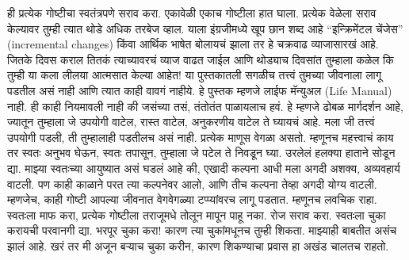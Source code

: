 ही प्रत्येक गोष्टीचा स्वतंत्रपणे सराव करा. एकावेळी एकाच गोष्टीला हात घाला. प्रत्येक वेळेला सराव केल्यावर तुम्ही त्यात थोडे अधिक तरबेज व्हाल. याला इंग्रजीमध्ये खूप छान शब्द आहे “इन्क्रिमेंटल चेंजेस” (incremental changes) किंवा आर्थिक भाषेत बोलायचं झाला तर हे चक्रवाढ व्याजासारखं आहे. जितके दिवस कराल तितकं त्याच्यावरचं व्याज वाढत जाईल आणि थोड्याच दिवसांत तुम्हाला कळेल कि तुम्ही या कला लीलया आत्मसात केल्या आहेत!
या पुस्तकातली सगळीच तत्त्वं तुमच्या जीवनाला लागू पडतील असं नाही आणि त्यात काही वावगं नाहीये. हे पुस्तक म्हणजे लाईफ मॅन्युअल (Life Manual) नाही. ही काही नियमावली नाही की जसंच्या तसं, तंतोतंत पाळायलाच हवं. हे म्हणजे ढोबळ मार्गदर्शन आहे, ज्यातून तुम्हाला जे उपयोगी वाटेल, रास्त वाटेल, अनुकरणीय वाटेल ते घ्यायचं आहे. मला जी तत्त्वं उपयोगी पडली, ती तुम्हालाही पडतीलच असं नाही. प्रत्येक माणूस वेगळा असतो. म्हणूनच महत्त्वाचं काय तर स्वतः अनुभव घेऊन, स्वतः तपासून, तुम्हाला जे पटेल ते निवडून घ्या. उरलेलं हलक्या हाताने सोडून द्या.
माझ्या स्वतःच्या आयुष्यात असं घडलं आहे की, एखादी कल्पना आधी मला अगदी अशक्य, अव्यवहार्य वाटली. पण काही काळाने परत त्या कल्पनेवर आलो, आणि तीच कल्पना तेव्हा अगदी योग्य वाटली. म्हणजेच, काही गोष्टी आपल्या जीवनात वेगवेगळ्या टप्प्यांवरच लागू पडतात.
म्हणूनच लवचिक राहा. स्वतःला माफ करा, प्रत्येक गोष्टीला तराजूमधे तोलून मापून पाहू नका. रोज सराव करा. स्वतःला चुका करायची परवानगी द्या. भरपूर चुका करा! कारण त्या चुकांमधूनच तुम्ही शिकता. माझ्याही बाबतीत असंच झालं आहे. खरं तर मी अजून बऱ्याच चुका करीन, कारण शिकण्याचा प्रवास हा अखंड चालतच राहतो.


